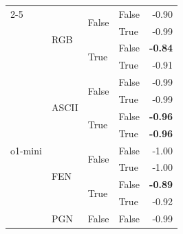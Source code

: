 \begin{tabular}{@{}llllr@{}}
    \cmidrule{2-5}                                                                                                         
                                    & \multirow[c]{4}{*}{RGB}   & \multirow[c]{2}{*}{False} & False                     & -0.90 \\
                                    &                           &                           & True                      & -0.99 \\
                                    &                           & \multirow[c]{2}{*}{True}  & False                     & \textbf{-0.84} \\
                                    &                           &                           & True                      & -0.91 \\
    \midrule                                                                                                               
    \multirow[c]{13}{*}{o1-mini}    & \multirow[c]{4}{*}{ASCII} & \multirow[c]{2}{*}{False} & False                     & -0.99 \\
                                    &                           &                           & True                      & -0.99 \\
                                    &                           & \multirow[c]{2}{*}{True}  & False                     & \textbf{-0.96} \\
                                    &                           &                           & True                      & \textbf{-0.96} \\
    \cmidrule{2-5}                                                                                                         
                                    & \multirow[c]{4}{*}{FEN}   & \multirow[c]{2}{*}{False} & False                     & -1.00 \\
                                    &                           &                           & True                      & -1.00 \\
                                    &                           & \multirow[c]{2}{*}{True}  & False                     & \textbf{-0.89} \\
                                    &                           &                           & True                      & -0.92 \\
    \cmidrule{2-5}                                                                                                         
                                    & \multirow[c]{4}{*}{PGN}   & \multirow[c]{2}{*}{False} & False                     & -0.99 \\

\end{tabular}
